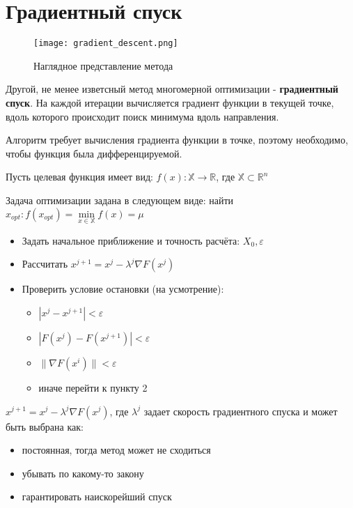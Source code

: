 \section{Градиентный спуск}

\begin{wrapfigure}{r}{0.25\textwidth}
\texttt{[image: gradient\_descent.png]} 
\caption{Наглядное представление метода}
\label{fig:wrapfig}
\end{wrapfigure}

Другой, не менее изветсный метод многомерной оптимизации - \textbf{градиентный спуск}. На каждой итерации вычисляется градиент функции в текущей точке, вдоль которого происходит поиск минимума вдоль направления.\\

\begin{remark*}
Алгоритм требует вычисления градиента функции в точке, поэтому необходимо, чтобы функция была дифференцируемой.\\
\end{remark*}

\begin{algo*}
Пусть целевая функция имеет вид:
$f(x): \mathbb{X} \rightarrow \mathbb{R}$, где $\mathbb{X} \subset \mathbb{R}^n$

Задача оптимизации задана в следующем виде:
найти $x_{opt}:f(x_{opt}) = \min\limits_{x\in \mathbb{X}}f(x) = \mu$


\begin{itemize}
    \item Задать начальное приближение и точность расчёта: $X_0, \varepsilon$
    \item Рассчитать $x^{j+1}=x^{j}-\lambda^{j} \nabla F\left(x^{j}\right)$
    \item Проверить условие остановки (на усмотрение):
    \begin{itemize}
        \item $|x^{j}-x^{j+1}|<\varepsilon$
        \item $|F(x^{j})-F(x^{j+1})|
        <\varepsilon$
        \item $\|\nabla F(x^{i})\|<\varepsilon$
        \item иначе перейти к пункту 2
    \end{itemize}
\end{itemize}

\end{algo*}

\begin{remark*}
$x^{j+1}=x^{j}-\lambda^{j} \nabla F\left(x^{j}\right)$, где $\lambda ^{j}$ задает скорость градиентного спуска и может быть выбрана как:
\begin{itemize}
    \item постоянная, тогда метод может не сходиться
    \item убывать по какому-то закону
    \item гарантировать наискорейший спуск\\
\end{itemize}
\end{remark*}



